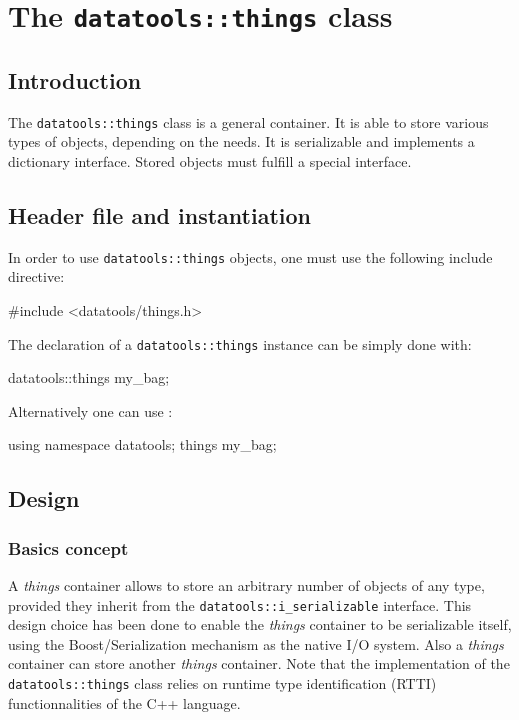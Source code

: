 \section{The \texttt{datatools::things} class}\label{sec:things}

\subsection{Introduction}

The  \texttt{datatools::things} class  is a  general container.
It is able to store various  types of objects, depending on the needs.
It  is  serializable and  implements  a  dictionary interface.  Stored
objects must fulfill a special interface.

\subsection{Header file and instantiation}

\pn  In   order  to  use  \texttt{datatools::things}
objects, one must use the following include directive:
\begin{CppVerbatim}
#include <datatools/things.h>
\end{CppVerbatim}

\pn The  declaration of a \texttt{datatools::things}
instance can be simply done with:
\begin{CppVerbatim}
datatools::things my_bag;
\end{CppVerbatim}
Alternatively one can use :
\begin{CppVerbatim}
using namespace datatools;
things my_bag;
\end{CppVerbatim}

\subsection{Design}

\subsubsection{Basics concept}

A  \emph{things} container  allows  to store  an  arbitrary number  of
objects   of    any   type,    provided   they   inherit    from   the
\texttt{datatools::i\_serializable}   interface.   This
design choice has  been done to enable the  \emph{things} container to
be serializable itself, using the Boost/Serialization mechanism as the
native I/O  system. Also a  \emph{things} container can  store another
\emph{things}   container.  Note  that   the  implementation   of  the
\texttt{datatools::things}   class  relies   on   runtime  type
identification (RTTI) functionnalities of the C++ language.

